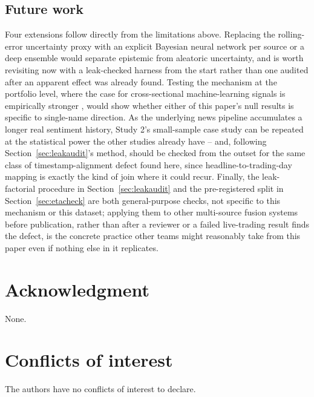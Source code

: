 \documentclass[10pt,a4paper,twocolumn]{article}
\begin{document}
\subsection{Future work}

Four extensions follow directly from the limitations above. Replacing the rolling-error uncertainty proxy with an explicit Bayesian neural network per source \cite{gal2016,kendall2017} or a deep ensemble \cite{lakshminarayanan2017} would separate epistemic from aleatoric uncertainty, and is worth revisiting now with a leak-checked harness from the start rather than one audited after an apparent effect was already found. Testing the mechanism at the portfolio level, where the case for cross-sectional machine-learning signals is empirically stronger \cite{gu2020}, would show whether either of this paper's null results is specific to single-name direction. As the underlying news pipeline accumulates a longer real sentiment history, Study 2's small-sample case study can be repeated at the statistical power the other studies already have -- and, following Section~\ref{sec:leakaudit}'s method, should be checked from the outset for the same class of timestamp-alignment defect found here, since headline-to-trading-day mapping is exactly the kind of join where it could recur. Finally, the leak-factorial procedure in Section~\ref{sec:leakaudit} and the pre-registered split in Section~\ref{sec:etacheck} are both general-purpose checks, not specific to this mechanism or this dataset; applying them to other multi-source fusion systems before publication, rather than after a reviewer or a failed live-trading result finds the defect, is the concrete practice other teams might reasonably take from this paper even if nothing else in it replicates.

\section*{Acknowledgment}
None.

\section*{Conflicts of interest}
The authors have no conflicts of interest to declare.
\end{document}
